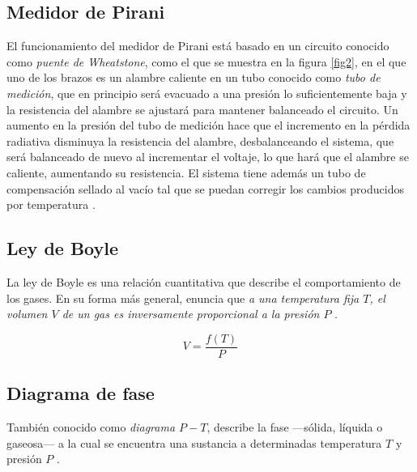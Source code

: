 \documentclass[final,5p,times,twocolumn, nopreprintline]{elsarticle}
\numberwithin{equation}{section}
\begin{document}
\subsection{Medidor de Pirani}

El funcionamiento del medidor de Pirani está basado en un circuito conocido como \emph{puente de Wheatstone}, como el que se muestra en la figura \ref{fig2}, en el que uno de los brazos es un alambre caliente en un tubo conocido como \emph{tubo de medición}, que en principio será evacuado a una presión lo suficientemente baja y la resistencia del alambre se ajustará para mantener balanceado el circuito. Un aumento en la presión del tubo de medición hace que el incremento en la pérdida radiativa disminuya la resistencia del alambre, desbalanceando el sistema, que será balanceado de nuevo al incrementar el voltaje, lo que hará que el alambre se caliente, aumentando su resistencia. El sistema tiene además un tubo de compensación sellado al vacío tal que se puedan corregir los cambios producidos por temperatura \cite{o2023users}.


\subsection{Ley de Boyle}

La ley de Boyle es una relación cuantitativa que describe el comportamiento de los gases. En su forma más general, enuncia que \emph{a una temperatura fija $T$, el volumen $V$ de un gas es inversamente proporcional a la presión $P$} \cite{kondepudi2014modern}.

\begin{equation}
V=\dfrac{f(T)}{P} \label{eq2}
\end{equation}

\subsection{Diagrama de fase}

También conocido como \emph{diagrama $P-T$}, describe la fase —sólida, líquida o gaseosa— a la cual se encuentra una sustancia a determinadas temperatura $T$ y presión $P$ \cite{ccengel2019termodinamica}.
\end{document}
